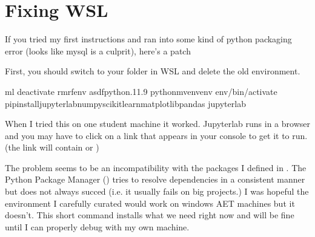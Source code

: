 \documentclass[letterpaper,10pt,english]{jupyterBook}
\begin{document}
\sphinxstepscope


\chapter{Fixing WSL}
\label{\detokenize{lessons/wsl:fixing-wsl}}\label{\detokenize{lessons/wsl::doc}}
\sphinxAtStartPar
If you tried my first instructions and ran into some kind of python packaging error (looks like mysql is a culprit), here’s a patch

\sphinxAtStartPar
First, you should switch to your  folder in WSL and delete the old environment.

\begin{sphinxVerbatim}[commandchars=\\\{\}]
\PYGZdl{}ml
\PYGZdl{}deactivate
\PYGZdl{}rm\PYGZhy{}rfenv
\PYGZdl{}asdfpython.11.9
\PYGZdl{}python\PYGZhy{}mvenvenv
\PYGZdl{}env/bin/activate
\PYGZdl{}pipinstalljupyterlabnumpyscikit\PYGZhy{}learnmatplotlibpandas
\PYGZdl{}jupyter\PYGZhy{}lab
\end{sphinxVerbatim}

\sphinxAtStartPar
When I tried this on one student machine it worked. Jupyterlab runs in a browser and you may have to click on a link that appears in your console to get it to run. (the link will contain  or )

\sphinxAtStartPar
The problem seems to be an incompatibility with the packages I defined in . The Python Package Manager () tries to resolve dependencies in a consistent manner but does not always succed (i.e. it usually fails on big projects.) I was hopeful the environment I carefully curated would work on windows AET machines but it doesn’t. This short  command installs what we need right now and will be fine until I can properly debug with my own machine.
\end{document}
